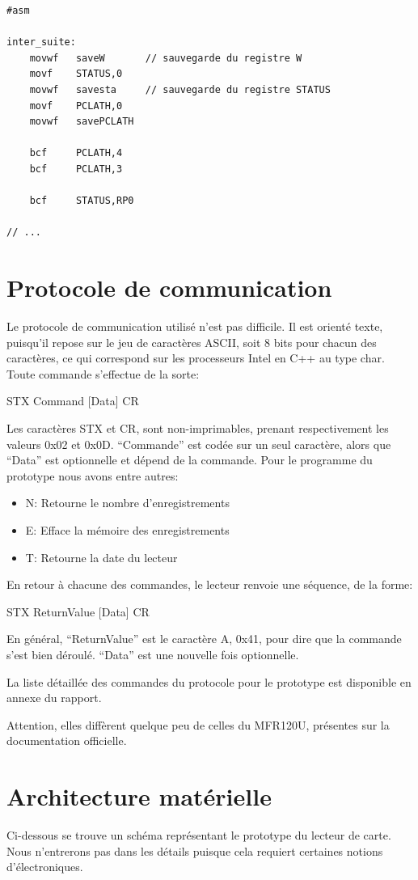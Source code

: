     \lstset{language=[x86masm]Assembler}
    \begin{lstlisting} 
#asm

inter_suite:
	movwf	saveW		// sauvegarde du registre W	
	movf	STATUS,0
	movwf	savesta		// sauvegarde du registre STATUS
	movf    PCLATH,0
	movwf	savePCLATH

	bcf		PCLATH,4
	bcf		PCLATH,3

	bcf	    STATUS,RP0

// ...
    \end{lstlisting}


    \section{Protocole de communication}
Le protocole de communication utilisé n'est pas difficile. Il est orienté 
texte, puisqu'il repose sur le jeu de caractères ASCII, soit 8 bits pour chacun des
caractères, ce qui correspond sur les processeurs Intel en C++ au type char. 
Toute commande s'effectue de la sorte:

STX Command [Data] CR

Les caractères STX et CR, sont non-imprimables, prenant respectivement les
valeurs 0x02 et 0x0D. ``Commande'' est codée sur un seul caractère, alors que ``Data''
est optionnelle et dépend de la commande. Pour le programme du prototype nous avons
entre autres:

    \begin{itemize}
    \item N: Retourne le nombre d'enregistrements
    \item E: Efface la mémoire des enregistrements
    \item T: Retourne la date du lecteur
    \end{itemize}

En retour à chacune des commandes, le lecteur renvoie une séquence, de la forme:

STX ReturnValue [Data] CR

En général, ``ReturnValue'' est le caractère A, 0x41, pour dire que
la commande s'est bien déroulé. ``Data'' est une nouvelle fois optionnelle.

La liste détaillée des commandes du protocole pour le prototype est disponible
en annexe du rapport. 

Attention, elles diffèrent quelque peu de celles du MFR120U, présentes sur 
la documentation officielle.
\newpage

    \section{Architecture matérielle}
Ci-dessous se trouve un schéma représentant le prototype du lecteur de carte.
Nous n'entrerons pas dans les détails puisque cela requiert certaines notions 
d'électroniques.

